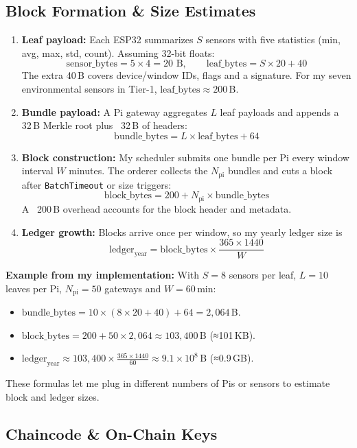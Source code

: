 \documentclass[12pt]{article}
\begin{document}
\subsection{Block Formation \& Size Estimates}

\begin{enumerate}
\item \textbf{Leaf payload:} Each ESP32 summarizes \(S\) sensors with five statistics (min, avg, max, std, count). Assuming 32-bit floats:
  \[
  \text{sensor\_bytes} = 5 \times 4 = 20\text{ B},\qquad
  \text{leaf\_bytes} = S \times 20 + 40
  \]
  The extra 40 B covers device/window IDs, flags and a signature. For my seven environmental sensors in Tier-1, \(\text{leaf\_bytes}≈200\) B.
\item \textbf{Bundle payload:} A Pi gateway aggregates \(L\) leaf payloads and appends a 32 B Merkle root plus ~32 B of headers:
  \[
  \text{bundle\_bytes} = L \times \text{leaf\_bytes} + 64
  \]
\item \textbf{Block construction:} My scheduler submits one bundle per Pi every window interval \(W\) minutes. The orderer collects the \(N_{\text{pi}}\) bundles and cuts a block after \texttt{BatchTimeout} or size triggers:
  \[
  \text{block\_bytes} = 200 + N_{\text{pi}} \times \text{bundle\_bytes}
  \]
  A ~200 B overhead accounts for the block header and metadata.
\item \textbf{Ledger growth:} Blocks arrive once per window, so my yearly ledger size is
  \[
  \text{ledger}_{\text{year}} = \text{block\_bytes} \times \frac{365\times1440}{W}
  \]
\end{enumerate}

\textbf{Example from my implementation:} With \(S=8\) sensors per leaf, \(L=10\) leaves per Pi, \(N_{\text{pi}}=50\) gateways and \(W=60\) min:

\begin{itemize}
\item \(\text{bundle\_bytes} = 10 \times (8\times20 + 40) + 64 = 2,064\) B.
\item \(\text{block\_bytes} = 200 + 50 \times 2,064 \approx 103,400\) B (≈101 KB).
\item \(\text{ledger}_{\text{year}} \approx 103,400 \times \frac{365\times1440}{60} \approx 9.1\times10^8\) B (≈0.9 GB).
\end{itemize}

These formulas let me plug in different numbers of Pis or sensors to estimate block and ledger sizes.

\subsection{Chaincode \& On-Chain Keys}
\end{document}
